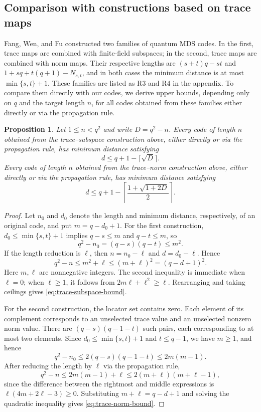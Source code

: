 \documentclass[preprint,12pt,a4paper]{elsarticle}
\newtheorem{proposition}[theorem]{Proposition}
\begin{document}
\subsection{Comparison with constructions based on trace maps}\label{subsec:comparisons}

Fang, Wen, and Fu \cite[Theorems~5--8]{FangWenFu2024} constructed two families of quantum MDS codes. In the first, trace maps are combined with finite-field subspaces; in the second, trace maps are combined with norm maps. Their respective lengths are $(s+t)q-st$ and $1+sq+t(q+1)-N_{s,t}$, and in both cases the minimum distance is at most $\min\{s,t\}+1$. These families are listed as R3 and R4 in the appendix. To compare them directly with our codes, we derive upper bounds, depending only on $q$ and the target length $n$, for all codes obtained from these families either directly or via the propagation rule.

\begin{proposition}\label{prop:fwf}
Let $1\le n<q^2$ and write $D=q^2-n$. Every code of length $n$ obtained from the trace--subspace construction above, either directly or via the propagation rule, has minimum distance satisfying
\begin{equation}\label{eq:trace-subspace-bound}
 d\le q+1-\lceil\sqrt D\rceil.
\end{equation}
Every code of length $n$ obtained from the trace--norm construction above, either directly or via the propagation rule, has minimum distance satisfying
\begin{equation}\label{eq:trace-norm-bound}
 d\le q+1-\left\lceil\frac{1+\sqrt{1+2D}}2\right\rceil.
\end{equation}
\end{proposition}

\begin{proof}
Let $n_0$ and $d_0$ denote the length and minimum distance, respectively, of an original code, and put $m=q-d_0+1$. For the first construction, $d_0\le\min\{s,t\}+1$ implies $q-s\le m$ and $q-t\le m$, so
\[
 q^2-n_0=(q-s)(q-t)\le m^2.
\]
If the length reduction is $\ell$, then $n=n_0-\ell$ and $d=d_0-\ell$. Hence
\[
 q^2-n\le m^2+\ell\le(m+\ell)^2=(q-d+1)^2.
\]
Here $m,\ell$ are nonnegative integers. The second inequality is immediate when $\ell=0$; when $\ell\ge1$, it follows from $2m\ell+\ell^2\ge\ell$. Rearranging and taking ceilings gives \eqref{eq:trace-subspace-bound}.

For the second construction, the locator set contains zero. Each element of its complement corresponds to an unselected trace value and an unselected nonzero norm value. There are $(q-s)(q-1-t)$ such pairs, each corresponding to at most two elements. Since $d_0\le\min\{s,t\}+1$ and $t\le q-1$, we have $m\ge1$, and hence
\[
 q^2-n_0\le2(q-s)(q-1-t)\le2m(m-1).
\]
After reducing the length by $\ell$ via the propagation rule,
\[
 q^2-n\le2m(m-1)+\ell\le2(m+\ell)(m+\ell-1),
\]
since the difference between the rightmost and middle expressions is $\ell(4m+2\ell-3)\ge0$. Substituting $m+\ell=q-d+1$ and solving the quadratic inequality gives \eqref{eq:trace-norm-bound}.
\end{proof}
\end{document}
